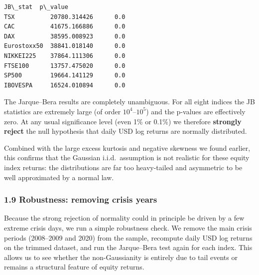 \documentclass[11pt]{article}
\begin{document}
            \begin{tcolorbox}[breakable, size=fbox, boxrule=.5pt, pad at break*=1mm, opacityfill=0]
\begin{Verbatim}[commandchars=\\\{\}]
                  JB\_stat  p\_value
TSX          20780.314426      0.0
CAC          41675.166886      0.0
DAX          38595.008923      0.0
Eurostoxx50  38841.018140      0.0
NIKKEI225    37864.111306      0.0
FTSE100      13757.475020      0.0
SP500        19664.141129      0.0
IBOVESPA     16524.010894      0.0
\end{Verbatim}
\end{tcolorbox}
        
    The Jarque--Bera results are completely unambiguous. For all eight
indices the JB statistics are extremely large (of order
\(10^4\)--\(10^5\)) and the p-values are effectively zero. At any usual
significance level (even 1\% or 0.1\%) we therefore \textbf{strongly
reject} the null hypothesis that daily USD log returns are normally
distributed.

Combined with the large excess kurtosis and negative skewness we found
earlier, this confirms that the Gaussian i.i.d.~assumption is not
realistic for these equity index returns: the distributions are far too
heavy-tailed and asymmetric to be well approximated by a normal law.

    \hypertarget{robustness-removing-crisis-years}{%
\subsubsection{1.9 Robustness: removing crisis
years}\label{robustness-removing-crisis-years}}

Because the strong rejection of normality could in principle be driven
by a few extreme crisis days, we run a simple robustness check. We
remove the main crisis periods (2008--2009 and 2020) from the sample,
recompute daily USD log returns on the trimmed dataset, and run the
Jarque--Bera test again for each index. This allows us to see whether
the non-Gaussianity is entirely due to tail events or remains a
structural feature of equity returns.
\end{document}
